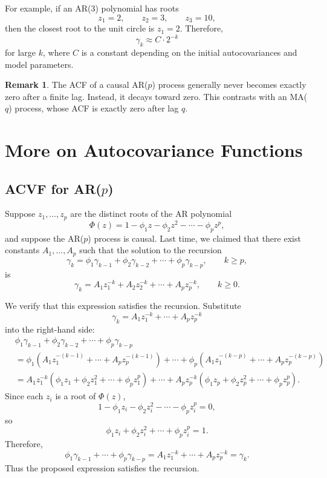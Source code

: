 \documentclass[12pt,oneside]{book}
\numberwithin{equation}{section}
\theoremstyle{definition}
\newtheorem{remark}{Remark}[section]
\theoremstyle{plain}
\theoremstyle{remark}
\begin{document}
For example, if an AR(3) polynomial has roots
\[
z_1=2,
\qquad
z_2=3,
\qquad
z_3=10,
\]
then the closest root to the unit circle is $z_1=2$. Therefore,
\[
\gamma_k
\approx C\cdot 2^{-k}
\]
for large $k$, where $C$ is a constant depending on the initial autocovariances and model parameters.

\begin{remark}
The ACF of a causal AR($p$) process generally never becomes exactly zero after a finite lag. Instead, it decays toward zero. This contrasts with an MA($q$) process, whose ACF is exactly zero after lag $q$.
\end{remark}

\section{More on Autocovariance Functions}

\subsection{ACVF for AR($p$)}

Suppose $z_1,\ldots,z_p$ are the distinct roots of the AR polynomial
\[
\Phi(z)=1-\phi_1z-\phi_2z^2-\cdots-\phi_pz^p,
\]
and suppose the AR($p$) process is causal. Last time, we claimed that there exist constants $A_1,\ldots,A_p$ such that the solution to the recursion
\[
\gamma_k
=
\phi_1\gamma_{k-1}
+
\phi_2\gamma_{k-2}
+\cdots+
\phi_p\gamma_{k-p},
\qquad k\geq p,
\]
is
\[
\gamma_k
=
A_1z_1^{-k}+A_2z_2^{-k}+\cdots+A_pz_p^{-k},
\qquad k\geq 0.
\]

We verify that this expression satisfies the recursion. Substitute
\[
\gamma_k
=
A_1z_1^{-k}+\cdots+A_pz_p^{-k}
\]
into the right-hand side:
\begin{align*}
&\phi_1\gamma_{k-1}
+
\phi_2\gamma_{k-2}
+\cdots+
\phi_p\gamma_{k-p} \\
&=
\phi_1\left(A_1z_1^{-(k-1)}+\cdots+A_pz_p^{-(k-1)}\right)
+
\cdots
+
\phi_p\left(A_1z_1^{-(k-p)}+\cdots+A_pz_p^{-(k-p)}\right) \\
&=
A_1z_1^{-k}
\left(\phi_1z_1+\phi_2z_1^2+\cdots+\phi_pz_1^p\right)
+
\cdots
+
A_pz_p^{-k}
\left(\phi_1z_p+\phi_2z_p^2+\cdots+\phi_pz_p^p\right).
\end{align*}
Since each $z_i$ is a root of $\Phi(z)$,
\[
1-\phi_1z_i-\phi_2z_i^2-\cdots-\phi_pz_i^p=0,
\]
so
\[
\phi_1z_i+\phi_2z_i^2+\cdots+\phi_pz_i^p=1.
\]
Therefore,
\[
\phi_1\gamma_{k-1}
+
\cdots+
\phi_p\gamma_{k-p}
=
A_1z_1^{-k}+\cdots+A_pz_p^{-k}
=
\gamma_k.
\]
Thus the proposed expression satisfies the recursion.
\end{document}
